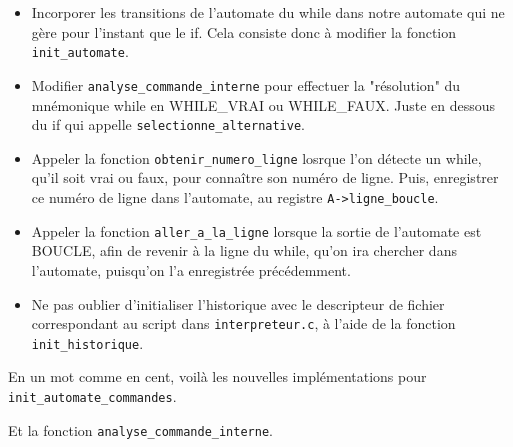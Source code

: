\documentclass[10pt]{article}
\begin{document}
\begin{enumerate}[label=\textbf{[\alph*]}]
  \begin{itemize}
  \item Incorporer les transitions de l'automate du while dans notre
    automate qui ne gère pour l'instant que le if. Cela consiste donc
    à modifier la fonction \texttt{init\_automate}.
  \item Modifier \texttt{analyse\_commande\_interne} pour effectuer la
    "résolution" du mnémonique while en WHILE\_VRAI ou
    WHILE\_FAUX. Juste en dessous du if qui appelle
    \texttt{selectionne\_alternative}.
  \item Appeler la fonction \texttt{obtenir\_numero\_ligne} losrque
    l'on détecte un while, qu'il soit vrai ou faux, pour connaître son
    numéro de ligne. Puis, enregistrer ce numéro de ligne dans
    l'automate, au registre \texttt{A->ligne\_boucle}.
  \item Appeler la fonction \texttt{aller\_a\_la\_ligne} lorsque la
    sortie de l'automate est BOUCLE, afin de revenir à la ligne du
    while, qu'on ira chercher dans l'automate, puisqu'on l'a
    enregistrée précédemment.
  \item Ne pas oublier d'initialiser l'historique avec le descripteur
    de fichier correspondant au script dans \texttt{interpreteur.c}, à
    l'aide de la fonction \texttt{init\_historique}.
  \end{itemize}

  En un mot comme en cent, voilà les nouvelles implémentations pour
  \texttt{init\_automate\_commandes}.

  

  \vspace{0.2cm}
  Et la fonction \texttt{analyse\_commande\_interne}.

  

\end{enumerate}
\end{document}
